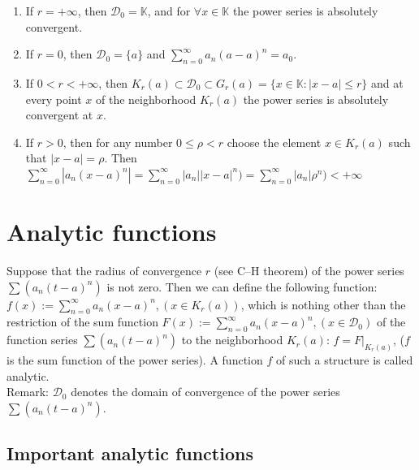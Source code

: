 \documentclass[margin=0px]{article}
\begin{document}
\begin{enumerate}
    \item If $r = +\infty$, then $\mathcal{D}_{0} = \mathbb{K}$, and for $\forall x \in \mathbb{K}$ the power series is absolutely convergent.
    \item If $r = 0$, then $\mathcal{D}_{0} = \{a\}$ and $\sum\limits_{n=0}^{\infty}{a_{n}(a-a)^{n}} = a_{0}$.
    \item If $0 < r < +\infty$, then $K_{r}(a) \subset \mathcal{D}_{0} \subset G_{r}(a) = \{x \in \mathbb{K} : |x-a| \leq r\}$ and at every point $x$ of the neighborhood $K_{r}(a)$ the power series is absolutely convergent at $x$.
    \item If $r > 0$, then for any number $0 \leq \rho < r$ choose the element $x \in K_{r}(a)$ such that $|x-a| = \rho$. Then $\sum\limits_{n=0}^{\infty}{|a_{n}(x-a)^{n}|} = \sum\limits_{n=0}^{\infty}{|a_{n}||x-a|^{n})} = \sum\limits_{n=0}^{\infty}{|a_{n}|\rho^{n})} < +\infty$
\end{enumerate}

\section{Analytic functions}

Suppose that the radius of convergence $r$ (see C--H theorem) of the power series $\sum{(a_{n}(t-a)^{n})}$ is not zero. Then we can define the following function: $f(x) := \sum\limits_{n=0}^{\infty}{a_{n}(x-a)^{n}}, (x \in K_{r}(a))$, which is nothing other than the restriction of the sum function $F(x) := \sum\limits_{n=0}^{\infty}{a_{n}(x-a)^{n}}, (x \in \mathcal{D}_{0})$ of the function series $\sum{(a_{n}(t-a)^{n})}$ to the neighborhood $K_{r}(a)$: $f = F|_{K_{r}(a)}$, ($f$ is the sum function of the power series). A function $f$ of such a structure is called analytic. \\
Remark: $\mathcal{D}_{0}$ denotes the domain of convergence of the power series $\sum{(a_{n}(t-a)^{n})}$.

\subsection{Important analytic functions}
\end{document}
